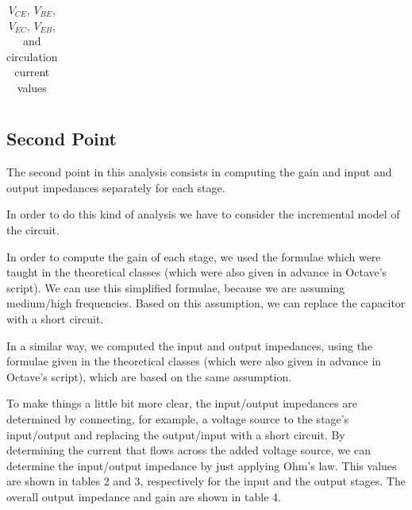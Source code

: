 \vspace{5mm}
\begin{table}[H]
	\centering
	\begin{tabularx}{0.9\textwidth} {
 	    | >{\raggedright\arraybackslash}X
  	    | >{\raggedleft\arraybackslash}X | }
	\hline
	
	\end{tabularx}
	\caption{$V_{CE}$, $V_{BE}$, $V_{EC}$, $V_{EB}$, and circulation current values}
	\label{tab:currents}
\end{table}
\vspace{5mm}

\subsection{Second Point}

\par The second point in this analysis consists in computing the gain and input and output impedances separately for each stage.
\par In order to do this kind of analysis we have to consider the incremental model of the circuit.


\par In order to compute the gain of each stage, we used the formulae which were taught in the theoretical classes (which were also given in advance in Octave's script). We can use this simplified formulae, because we are assuming medium/high frequencies. Based on this assumption, we can replace the capacitor with a short circuit.
\par In a similar way, we computed the input and output impedances, using the formulae given in the theoretical classes (which were also given in advance in Octave's script), which are based on the same assumption.
\par To make things a little bit more clear, the input/output impedances are determined by connecting, for example, a voltage source to the stage's input/output and replacing the output/input with a short circuit. By determining the current that flows across the added voltage source, we can determine the input/output impedance by just applying Ohm's law. This values are shown in tables 2 and 3, respectively for the input and the output stages. The overall output impedance and gain are shown in table 4.

